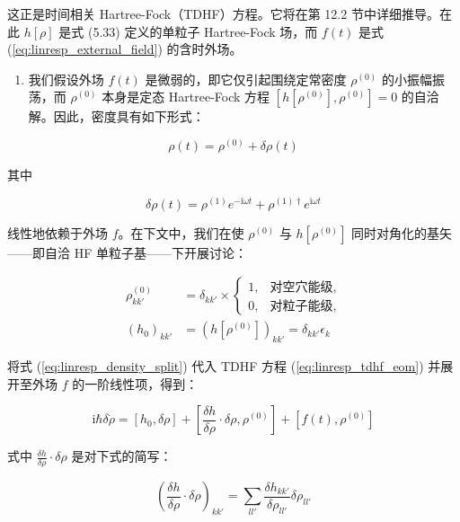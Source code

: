 这正是时间相关 Hartree-Fock（TDHF）方程。它将在第 12.2 节中详细推导。在此 $h[\rho]$ 是式 (5.33)
定义的单粒子 Hartree-Fock 场，而 $f(t)$ 是式 (\ref{eq:linresp_external_field})
的含时外场。
\begin{enumerate}
\item 我们假设外场 $f(t)$ 是微弱的，即它仅引起围绕定常密度 $\rho^{(0)}$ 的小振幅振荡，而 $\rho^{(0)}$
本身是定态 Hartree-Fock 方程 $[h[\rho^{(0)}],\rho^{(0)}]=0$ 的自洽解。因此，密度具有如下形式：
\end{enumerate}
\begin{equation}
\rho(t)=\rho^{(0)}+\delta\rho(t)\label{eq:linresp_density_split}
\end{equation}

其中

\begin{equation}
\delta\rho(t)=\rho^{(1)}e^{-\mathrm{i}\omega t}+\rho^{(1)\dagger}e^{\mathrm{i}\omega t}\label{eq:linresp_deltarho_fourier}
\end{equation}

线性地依赖于外场 $f$。在下文中，我们在使 $\rho^{(0)}$ 与 $h[\rho^{(0)}]$ 同时对角化的基矢——即自洽
HF 单粒子基——下开展讨论：

\begin{align}
\rho^{(0)}_{kk'} & =\delta_{kk'}\times\begin{cases}
1, & \text{对空穴能级},\\
0, & \text{对粒子能级},
\end{cases}\label{eq:linresp_rho0_diagonal}\\
(h_{0})_{kk'} & =(h[\rho^{(0)}])_{kk'}=\delta_{kk'}\epsilon_{k}\label{eq:linresp_h0_diagonal}
\end{align}

将式 (\ref{eq:linresp_density_split}) 代入 TDHF 方程 (\ref{eq:linresp_tdhf_eom})
并展开至外场 $f$ 的一阶线性项，得到：

\begin{equation}
\mathrm{i}\hbar\delta\dot{\rho}=[h_{0},\delta\rho]+\left[\frac{\delta h}{\delta\rho}\cdot\delta\rho,\rho^{(0)}\right]+[f(t),\rho^{(0)}]\label{eq:linresp_linearized_eom}
\end{equation}

式中 $\frac{\delta h}{\delta\rho}\cdot\delta\rho$ 是对下式的简写：

\begin{equation}
\left(\frac{\delta h}{\delta\rho}\cdot\delta\rho\right)_{kk'}=\sum_{ll'}\frac{\delta h_{kk'}}{\delta\rho_{ll'}}\delta\rho_{ll'}\label{eq:linresp_deltah_chain}
\end{equation}

